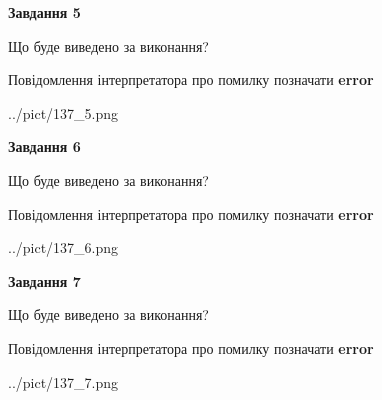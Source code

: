 \documentclass[10pt, ukrainian]{article}
\begin{document}
{\begin {large}
{\begin {center}\textbf{Завдання 5}\end {center}}\par
Що буде виведено за виконання? \par
Повідомлення інтерпретатора про помилку позначати \textbf{error}

\begin{center}
	{../pict/137_5.png}
\end{center}
\newpage

{\begin {center}\textbf{Завдання 6}\end {center}}\par
Що буде виведено за виконання? \par
Повідомлення інтерпретатора про помилку позначати \textbf{error}

\begin{center}
	{../pict/137_6.png}
\end{center}
\newpage

{\begin {center}\textbf{Завдання 7}\end {center}}\par
Що буде виведено за виконання? \par
Повідомлення інтерпретатора про помилку позначати \textbf{error}

\begin{center}
	{../pict/137_7.png}
\end{center}
\newpage

\end {large}}
\end{document}
